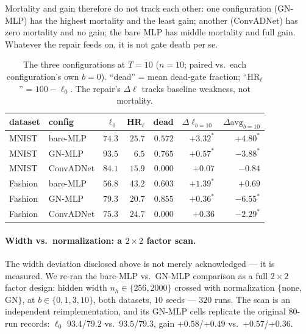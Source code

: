 \documentclass[10pt]{article}
\begin{document}
Mortality and gain therefore do not track each other: one configuration
(GN-MLP) has the highest mortality and the least gain; another
(ConvADNet) has zero mortality and no gain; the bare MLP has middle
mortality and full gain. Whatever the repair feeds on, it is not gate
death per se.

\begin{table}[t]
\centering\small
\caption{The three configurations at $T{=}10$ ($n{=}10$; paired
vs.\ each configuration's own $b{=}0$). ``dead'' = mean dead-gate
fraction; ``HR$_\ell$'' = $100 - \ell_0$. The repair's
$\Delta\ell$ tracks baseline weakness, not mortality.}
\label{tab:three}
\begin{tabular}{llrrrrr}
\toprule
dataset & config & $\ell_0$ & HR$_\ell$ & dead &
$\Delta\ell_{b=10}$ & $\Delta\mathrm{avg}_{b=10}$ \\
\midrule
MNIST & bare-MLP & $74.3$ & $25.7$ & $0.572$ &
$+3.32^{*}$ & $+4.80^{*}$ \\
MNIST & GN-MLP & $93.5$ & $6.5$ & $\mathbf{0.765}$ &
$+0.57^{*}$ & $-3.88^{*}$ \\
MNIST & ConvADNet & $84.1$ & $15.9$ & $\mathbf{0.000}$ &
$+0.07$ & $-0.84$ \\
\midrule
Fashion & bare-MLP & $56.8$ & $43.2$ & $0.603$ &
$+1.39^{*}$ & $+0.69$ \\
Fashion & GN-MLP & $79.3$ & $20.7$ & $\mathbf{0.855}$ &
$+0.36^{*}$ & $-6.55^{*}$ \\
Fashion & ConvADNet & $75.3$ & $24.7$ & $\mathbf{0.000}$ &
$+0.36$ & $-2.29^{*}$ \\
\bottomrule
\end{tabular}
\end{table}

\paragraph{Width vs.\ normalization: a $2{\times}2$ factor scan.}
The width deviation disclosed above is not merely acknowledged --- it
is measured. We re-ran the bare-MLP vs.\ GN-MLP comparison as a full
$2{\times}2$ factor design: hidden width $n_h \in \{256, 2000\}$
crossed with normalization $\{$none, $\mathrm{GN}\}$, at $b \in
\{0,1,3,10\}$, both datasets, $10$ seeds --- $320$ runs. The scan is
an independent reimplementation, and its GN-MLP cells replicate the
original $80$-run records: $\ell_0$ $93.4$/$79.2$ vs.\
$93.5$/$79.3$, gain $+0.58$/$+0.49$ vs.\ $+0.57$/$+0.36$.
\end{document}
